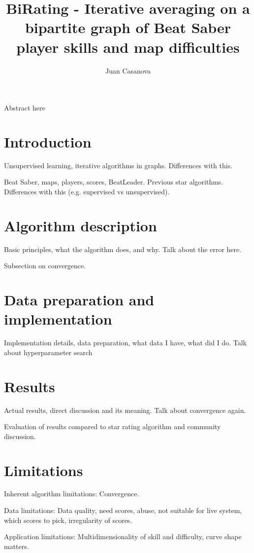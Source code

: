\documentclass[12pt,a4paper]{article}
\title{BiRating - Iterative averaging on a bipartite graph of Beat Saber player skills and map difficulties}
\author{Juan Casanova}
\begin{document}
\maketitle

Abstract here

\section{Introduction}

Unsupervised learning, iterative algorithms in graphs. Differences with this.

Beat Saber, maps, players, scores, BeatLeader. Previous star algorithms. Differences with this (e.g. supervised vs unsupervised).

\section{Algorithm description}

Basic principles, what the algorithm does, and why.
Talk about the error here.

Subsection on convergence.

\section{Data preparation and implementation}

Implementation details, data preparation, what data I have, what did I do.
Talk about hyperparameter search

\section{Results}

Actual results, direct discussion and its meaning. Talk about convergence again.

Evaluation of results compared to star rating algorithm and community discussion.

\section{Limitations}

Inherent algorithm limitations: Convergence.

Data limitations: Data quality, need scores, abuse, not suitable for live system, which scores to pick, irregularity of scores.

Application limitations: Multidimensionality of skill and difficulty, curve shape matters.
\end{document}

